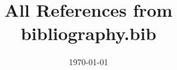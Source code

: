 \documentclass{aastex631}
\begin{document}
\title{All References from bibliography.bib}
\date{\today}

\maketitle

\nocite{*}



\end{document}
